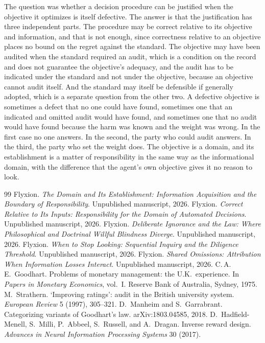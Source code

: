 \documentclass[11pt]{article}
\theoremstyle{plain}
\theoremstyle{definition}
\begin{document}
The question was whether a decision procedure can be justified when the objective it optimizes is itself defective. The answer is that the justification has three independent parts. The procedure may be correct relative to its objective and information, and that is not enough, since correctness relative to an objective places no bound on the regret against the standard. The objective may have been audited when the standard required an audit, which is a condition on the record and does not guarantee the objective's adequacy, and the audit has to be indicated under the standard and not under the objective, because an objective cannot audit itself. And the standard may itself be defensible if generally adopted, which is a separate question from the other two. A defective objective is sometimes a defect that no one could have found, sometimes one that an indicated and omitted audit would have found, and sometimes one that no audit would have found because the harm was known and the weight was wrong. In the first case no one answers. In the second, the party who could audit answers. In the third, the party who set the weight does. The objective is a domain, and its establishment is a matter of responsibility in the same way as the informational domain, with the difference that the agent's own objective gives it no reason to look.

\begin{thebibliography}{99}
 Flyxion. \emph{The Domain and Its Establishment: Information Acquisition and the Boundary of Responsibility}. Unpublished manuscript, 2026.
 Flyxion. \emph{Correct Relative to Its Inputs: Responsibility for the Domain of Automated Decisions}. Unpublished manuscript, 2026.
 Flyxion. \emph{Deliberate Ignorance and the Law: Where Philosophical and Doctrinal Willful Blindness Diverge}. Unpublished manuscript, 2026.
 Flyxion. \emph{When to Stop Looking: Sequential Inquiry and the Diligence Threshold}. Unpublished manuscript, 2026.
 Flyxion. \emph{Shared Omissions: Attribution When Information Losses Interact}. Unpublished manuscript, 2026.
 C.\,A.\,E.\ Goodhart. Problems of monetary management: the U.K.\ experience. In \emph{Papers in Monetary Economics}, vol.\ I. Reserve Bank of Australia, Sydney, 1975.
 M.\ Strathern. `Improving ratings': audit in the British university system. \emph{European Review} 5 (1997), 305--321.
 D.\ Manheim and S.\ Garrabrant. Categorizing variants of Goodhart's law. arXiv:1803.04585, 2018.
 D.\ Hadfield-Menell, S.\ Milli, P.\ Abbeel, S.\ Russell, and A.\ Dragan. Inverse reward design. \emph{Advances in Neural Information Processing Systems} 30 (2017).
\end{thebibliography}
\end{document}
